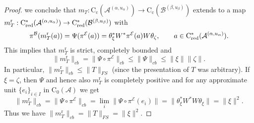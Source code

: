 \documentclass[11 pt, leqno]{amsart}
\numberwithin{equation}{section}
\theoremstyle{plain}
\theoremstyle{definition}
\newcommand*{\contc}{\mathrm{C_c}}%
\newcommand*{\contz}{\mathrm{C_0}}%
\DeclareMathOperator{\red}{red}%
\DeclareMathOperator{\rd}{r}%
\DeclareMathOperator{\dashind}{-Ind}
\newcommand{\B}{\mathcal B}
\newcommand{\m}{m}
\newcommand{\G}{\mathcal G} %
\newcommand{\EE}{\mathcal E}
\newcommand{\A}{\mathcal A}
\newcommand{\cst}{\ifmmode\mathrm{C}^*\else{$\mathrm{C}^*$}\fi}
\begin{document}
\begin{proof}
we conclude that $\m_{T} : \contc(\A^{(\alpha,u_{\alpha})})\to \contc(\B^{(\beta,u_{\beta})})$ extends to a map $\m_{T}^{\rd}:\cst_{\red}(\A^{(\alpha,u_{\alpha})})\to \cst_{\red}(\B^{(\beta,u_{\beta})})$ with
\[
    \pi^{\B}(\m_{T}^{\rd}(a)) = \Psi(\pi^{\EE}(a)) = \theta_\xi^* W^*\pi^{\EE}(a) W\theta_\zeta, \qquad a\in \cst_{\red}(\A^{(\alpha,u_{\alpha})}).
\]
This implies that $\m_{T}^{\rd}$ is strict, completely bounded and
\[
    \| \m_{T}^{\rd} \|_{cb} = \| \Psi\circ \pi^{\EE} \|_{cb} \leq \|\Psi\|_{cb}\leq \|\xi\|\|\zeta\|.
\]
In particular, $\|\m_{T}^{\rd}\|_{cb}\leq \|T\|_{FS}$ (since the presentation of $T$ was arbitrary). 
If $\xi=\zeta$, then $\Psi$ and hence also $\m_{T}^{\rd}$ is completely positive and for any approximate unit $\{e_i\}_{i\in I}$ in $\contz(\A)$ we get
\[
    \| \m_{T}^{\rd} \|_{cb} = \| \Psi\circ \pi^{\EE} \|_{cb} = \lim_{i} \|\Psi\circ \pi^{\EE} (e_{i}) \| = \| \theta_\xi^*W^*W\theta_\xi\| = \|\xi\|^2.
\]
Thus we have $\|\m_{T}^{\rd}\|_{cb}= \|T\|_{FS}=\|\xi\|^2$.


\end{proof}
\end{document}
